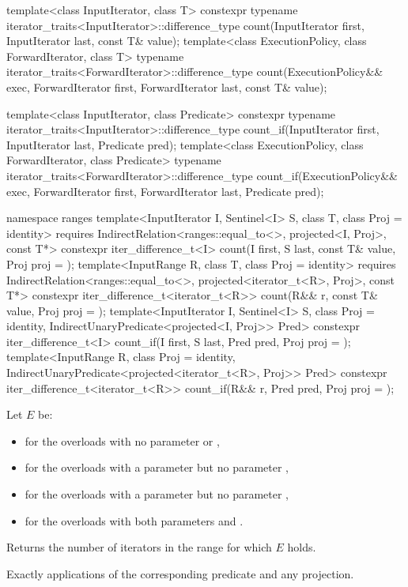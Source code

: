 %
%
\begin{itemdecl}
template<class InputIterator, class T>
  constexpr typename iterator_traits<InputIterator>::difference_type
    count(InputIterator first, InputIterator last, const T& value);
template<class ExecutionPolicy, class ForwardIterator, class T>
  typename iterator_traits<ForwardIterator>::difference_type
    count(ExecutionPolicy&& exec,
          ForwardIterator first, ForwardIterator last, const T& value);

template<class InputIterator, class Predicate>
  constexpr typename iterator_traits<InputIterator>::difference_type
    count_if(InputIterator first, InputIterator last, Predicate pred);
template<class ExecutionPolicy, class ForwardIterator, class Predicate>
  typename iterator_traits<ForwardIterator>::difference_type
    count_if(ExecutionPolicy&& exec,
             ForwardIterator first, ForwardIterator last, Predicate pred);

namespace ranges {
  template<InputIterator I, Sentinel<I> S, class T, class Proj = identity>
    requires IndirectRelation<ranges::equal_to<>, projected<I, Proj>, const T*>
    constexpr iter_difference_t<I>
      count(I first, S last, const T& value, Proj proj = {});
  template<InputRange R, class T, class Proj = identity>
    requires IndirectRelation<ranges::equal_to<>, projected<iterator_t<R>, Proj>, const T*>
    constexpr iter_difference_t<iterator_t<R>>
      count(R&& r, const T& value, Proj proj = {});
  template<InputIterator I, Sentinel<I> S, class Proj = identity,
           IndirectUnaryPredicate<projected<I, Proj>> Pred>
    constexpr iter_difference_t<I>
      count_if(I first, S last, Pred pred, Proj proj = {});
  template<InputRange R, class Proj = identity,
           IndirectUnaryPredicate<projected<iterator_t<R>, Proj>> Pred>
    constexpr iter_difference_t<iterator_t<R>>
      count_if(R&& r, Pred pred, Proj proj = {});
}
\end{itemdecl}

\begin{itemdescr}
\pnum
Let $E$ be:
\begin{itemize}
\item
   for the overloads
  with no parameter  or ,
\item
   for the overloads
  with a parameter  but no parameter ,
\item
   for the overloads
  with a parameter  but no parameter ,
\item
   for the overloads
  with both parameters  and .
\end{itemize}

\pnum
\effects
Returns the number of iterators  in the range 
for which $E$ holds.

\pnum
\complexity
Exactly  applications
of the corresponding predicate and any projection.
\end{itemdescr}

